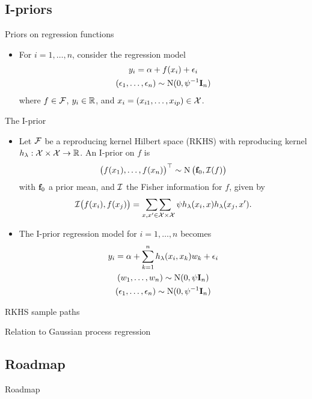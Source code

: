 \subsection{I-priors}

\begin{frame}{Priors on regression functions}
  \begin{itemize}\setlength\itemsep{1em}
    \item For $i = 1, \dots, n$, consider the regression model
    \begin{align*}
      \begin{gathered}
        y_i = \alpha + f(x_i) + \epsilon_i \\
        (\epsilon_1, \dots, \epsilon_n) \sim \operatorname{N}(0, \psi^{-1} {\mathbf I}_n)
      \end{gathered}
    \end{align*}
    where $f \in {\mathcal F}$, $y_i \in \mathbb{R}$, and $x_i = (x_{i1}, \dots, x_{ip}) \in {\mathcal X}$.
  \end{itemize}
\end{frame}

\begin{frame}{The I-prior}
  \vspace{-15pt}
  \begin{itemize}\setlength\itemsep{1em}
    \item Let ${\mathcal F}$ be a reproducing kernel Hilbert space (RKHS) with reproducing kernel $h_\lambda: {\mathcal X} \times {\mathcal X} \rightarrow \mathbb{R}$. An I-prior on $f$ is
    \[
      \big(f(x_1), \dots, f(x_n)\big)^\top \sim \operatorname{N}\big({\mathbf f}_0, {\mathcal I}(f)\big)
    \] 
    with ${\mathbf f}_0$ a prior mean, and ${\mathcal I}$ the Fisher information for $f$, given by
    \[
      {\mathcal I}\big(f(x_i), f(x_j)\big) = \mathop{\sum \sum}_{x,x' \in {\mathcal X} \times {\mathcal X}} \psi h_\lambda(x_i,x) h_\lambda(x_j,x').
    \]
    \item The I-prior regression model for $i = 1,\dots,n$ becomes
    \begin{align*}
      \begin{gathered}
        y_i = \alpha + \sum_{k=1}^n h_\lambda(x_i, x_k)w_k + \epsilon_i \\
        (w_1, \dots, w_n) \sim \operatorname{N}(0, \psi {\mathbf I}_n) \\
        (\epsilon_1, \dots, \epsilon_n) \sim \operatorname{N}(0, \psi^{-1} {\mathbf I}_n)
      \end{gathered}    
    \end{align*}
  \end{itemize}
\end{frame}

\begin{frame}{RKHS sample paths}
\end{frame}
\begin{frame}{Relation to Gaussian process regression}
\end{frame}

\subsection{Roadmap}
\begin{frame}{Roadmap}
\end{frame}